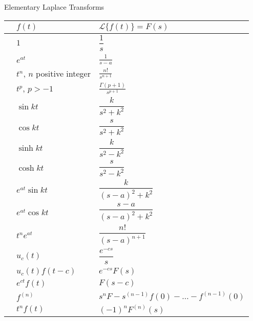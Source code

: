 \documentclass[12pt]{exam}
\begin{document}
    


\newpage

\begin{center}
\begin{large}
Elementary Laplace Transforms
\end{large}
\end{center}

\newcommand{\LTNUM}{\stepcounter{NumberInTable}{(\theNumberInTable)}}

\vspace{-2ex}
    \begin{center}
    \begin{tabular}{ p{1cm} p{4cm} p{6cm} }
        & $f(t)$ & $\mathcal  L\{f(t)\}  =F(s)$ \\ \hline
        \LTNUM & $1$ & $\displaystyle \dfrac{1}{s}$  \\[12pt]
        \LTNUM & $e^{at}$	& $\displaystyle \frac{1}{s-a}$ \\ 
        \LTNUM & $t^n$, $n$ positive integer	& $\displaystyle \frac{n!}{s^{n+1}}$  \\[12pt]
        \LTNUM & $t^p$, $p > -1$	& $\displaystyle \frac{\Gamma(p+1)}{s^{p+1}}$  \\[12pt]
        \LTNUM &$\sin kt$ 	& $\displaystyle \dfrac{k}{s^2+k^2}$ \\[12pt]
        \LTNUM &$\cos kt$ 	& $\displaystyle \dfrac{s}{s^2+k^2}$ \\[12pt]
        \LTNUM &$\sinh kt$	& $\displaystyle \dfrac{k}{s^2-k^2}$ \\[12pt]
        \LTNUM &$\cosh kt$	& $\displaystyle \dfrac{s}{s^2-k^2}$ \\[12pt]
        \LTNUM &$e^{at}\sin kt$	& $\displaystyle \dfrac{k}{(s-a)^2+k^2}$   \\[12pt]
        \LTNUM &$e^{at}\cos kt$	& $\displaystyle \dfrac{s-a}{(s-a)^2+k^2}$  \\[12pt]
        \LTNUM &$t^ne^{at}$	& $\displaystyle \dfrac{n!}{(s-a)^{n+1}}$  \\[12pt]
        \LTNUM &$u_c(t)$	& $\displaystyle \dfrac{e^{-cs}}{s}$  \\[12pt]
        \LTNUM &$u_c(t)f(t-c)$& $\displaystyle e^{-cs}F(s)$  \\[12pt]
        \LTNUM &$e^{ct}f(t)$& $\displaystyle F(s-c)$  \\[12pt]
        \LTNUM &$f^{(n)}$& $\displaystyle s^nF-s^{(n-1)}f(0) - \ldots -f^{(n-1)}(0)$  \\[12pt]
        \LTNUM & $t^n f(t)$& $\displaystyle (-1)^nF^{(n)}(s)$  \\[12pt]
    \end{tabular}
    \renewcommand{\arraystretch}{1}

\end{center}
\end{document}
